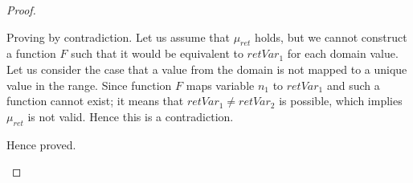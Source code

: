 \documentclass{llncs}
\newcommand{\retVar}{\textit{retVar}}
\newcommand{\F}{\mathit{F}}
\newcommand{\n}{\textit{n}}
\newcommand{\formula}{\mu}
\begin{document}
\begin{subappendices}
\begin{proof}
\begin{enumerate}
    Proving by contradiction. Let us assume that $\formula_{ret}$
    holds, but we cannot construct a
    function $\F$ such that it would be equivalent to $\retVar_1$ for
    each domain value. Let us consider the case that a value
    from the domain is not mapped to a unique value in the range.
    Since function $\F$ maps 
    variable $\n_1$ to $\retVar_1$ and such a function cannot exist;
    it means that $\retVar_1 \neq \retVar_2$ is possible, which
    implies $\formula_{ret}$ is not valid.
    Hence this
    is a contradiction.

    Hence proved.
  \end{enumerate}
\end{proof}


\end{subappendices}
\end{document}
